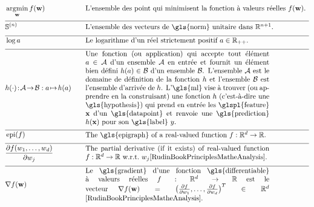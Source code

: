 \newpage
\begin{align}
    &\argmin_{\weights} f(\weights) &\quad &\mbox{L'ensemble des point qui minimisent la fonction à valeurs réelles $f(\weights)$.  } \nonumber \\[2mm] \hline \nonumber\\[-5mm]
    &\sphere{\nrnodes} &\quad &\mbox{L'ensemble des vecteurs de \gls{norm} unitaire dans $\mathbb{R}^{\nrnodes+1}$.  }\nonumber \\[2mm] \hline \nonumber\\[-5mm]
	 &\log a &\quad &\mbox{Le logarithme d'un réel strictement positif $a \in \mathbb{R}_{++}$.  } \nonumber \\[2mm] \hline \nonumber\\[-5mm]
	 &\hypothesis(\cdot)\!:\!\mathcal{A}\!\rightarrow\!\mathcal{B} :  a \!\mapsto\!h(a) &\quad &\parbox{.75\textwidth}{
	 	Une fonction (ou application) qui accepte tout élément \( a \in \mathcal{A} \) d'un ensemble \( \mathcal{A} \) en entrée et fournit un élément bien défini \( h(a) \in \mathcal{B} \) d'un ensemble \( \mathcal{B} \). L'ensemble \( \mathcal{A} \) est le domaine de définition de la fonction \( h \) et l'ensemble \( \mathcal{B} \) est l'ensemble d'arrivée de \( \hypothesis \). L'\gls{ml} vise à trouver (ou apprendre en la construisant) une fonction \( \hypothesis \) (c'est-à-dire une \gls{hypothesis}) qui prend en entrée les \glspl{feature} \( \featurevec \) d'un \gls{datapoint} et renvoie une \gls{prediction} \( \hypothesis(\featurevec) \) pour son \gls{label} \( \truelabel \).
 	} \nonumber \\[2mm] \hline \nonumber\\[-5mm]
 		&\operatorname{epi}(f)  & \quad & \parbox{.75\textwidth}{The \gls{epigraph} of a real-valued function 
 			$f: \mathbb{R}^{\featuredim}\rightarrow \mathbb{R}$.} \nonumber \\[2mm]  \hline \nonumber\\[-5mm]
 		&  \frac{\partial f(\weight_{1},\ldots,\weight_{\nrfeatures})}{\partial \weight_{\featureidx}} & \quad & \parbox{.75\textwidth}{The partial derivative (if it exists) of 
 			real-valued function 
 			$f: \mathbb{R}^{\featuredim}\rightarrow \mathbb{R}$ w.r.t.\ $\weight_{\featureidx}$\cite[Ch. 9]{RudinBookPrinciplesMatheAnalysis}.}    \nonumber \\[2mm]  	 \hline \nonumber\\[-5mm]
	 	&\nabla f(\weights) & \quad & \parbox{.75\textwidth}{Le  \gls{gradient} d'une fonction \gls{differentiable} à valeurs réelles
	 	$f: \mathbb{R}^{\featuredim}\rightarrow \mathbb{R}$ est le vecteur
	 	$\nabla f(\weights) = \big( \frac{\partial f}{\partial \weight_{1}},\ldots,\frac{\partial f}{\partial \weight_{\featuredim}}  \big)^{T} \in \mathbb{R}^{\featuredim}$ \cite[Ch. 9]{RudinBookPrinciplesMatheAnalysis}.}   \nonumber
\end{align} 
